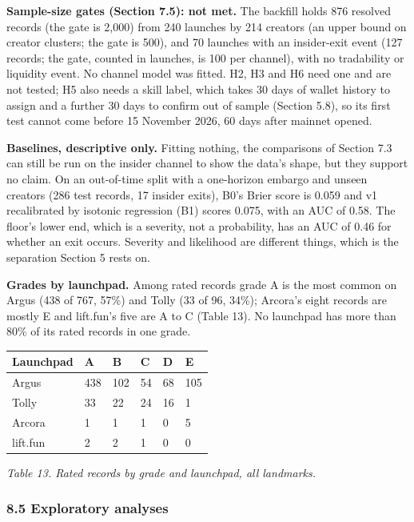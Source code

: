\textbf{Sample-size gates (Section 7.5): not met.} The backfill holds 876 resolved records (the gate is 2,000) from 240 launches by 214 creators (an upper bound on creator clusters; the gate is 500), and 70 launches with an insider-exit event (127 records; the gate, counted in launches, is 100 per channel), with no tradability or liquidity event. No channel model was fitted. H2, H3 and H6 need one and are not tested; H5 also needs a skill label, which takes 30 days of wallet history to assign and a further 30 days to confirm out of sample (Section 5.8), so its first test cannot come before 15 November 2026, 60 days after mainnet opened.

\textbf{Baselines, descriptive only.} Fitting nothing, the comparisons of Section 7.3 can still be run on the insider channel to show the data's shape, but they support no claim. On an out-of-time split with a one-horizon embargo and unseen creators (286 test records, 17 insider exits), B0's Brier score is 0.059 and v1 recalibrated by isotonic regression (B1) scores 0.075, with an AUC of 0.58. The floor's lower end, which is a severity, not a probability, has an AUC of 0.46 for whether an exit occurs. Severity and likelihood are different things, which is the separation Section 5 rests on.

\textbf{Grades by launchpad.} Among rated records grade A is the most common on Argus (438 of 767, 57\%) and Tolly (33 of 96, 34\%); Arcora's eight records are mostly E and lift.fun's five are A to C (Table 13). No launchpad has more than 80\% of its rated records in one grade.

{\def\LTcaptype{none} %
\begin{longtable}[]{@{}llllll@{}}
\toprule\noalign{}
Launchpad & A & B & C & D & E \\
\midrule\noalign{}
\endhead
\bottomrule\noalign{}
\endlastfoot
Argus & 438 & 102 & 54 & 68 & 105 \\
Tolly & 33 & 22 & 24 & 16 & 1 \\
Arcora & 1 & 1 & 1 & 0 & 5 \\
lift.fun & 2 & 2 & 1 & 0 & 0 \\
\end{longtable}
}

\emph{Table 13. Rated records by grade and launchpad, all landmarks.}

\subsubsection{8.5 Exploratory analyses}\label{exploratory-analyses}

